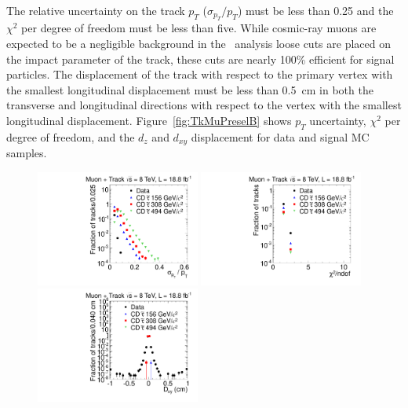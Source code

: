 The relative uncertainty on the track $p_T$ ($\sigma_{p_T}/p_T$) must be less than 0.25 and the $\chi^2$ per degree of freedom must be less than five.
While cosmic-ray muons are expected to be a negligible background in the \tktof\ analysis loose cuts are placed on the impact parameter of the track, 
these cuts are nearly 100\% efficient for signal particles.
The displacement of the track with respect to the primary vertex
with the smallest longitudinal displacement must be less than 0.5~cm in both the transverse and longitudinal directions with respect to the vertex with the smallest
longitudinal displacement.
Figure~\ref{fig:TkMuPreselB} shows $p_T$ uncertainty, $\chi^2$ per degree of freedom, and the $d_z$ and $d_{xy}$ displacement for data and signal MC samples.

\begin{figure}
\centering
  \includegraphics[clip=false, trim=0.0cm 0cm 0.0cm 0cm, width=0.48\textwidth]{figures/tkmu/Selection_Comp_8TeV_GMStau_Pterr_BS}
  \includegraphics[clip=false, trim=0.0cm 0cm 0.0cm 0cm, width=0.48\textwidth]{figures/tkmu/Selection_Comp_8TeV_GMStau_Chi2_BS} \\
  \includegraphics[clip=false, trim=0.0cm 0cm 0.0cm 0cm, width=0.48\textwidth]{figures/tkmu/Selection_Comp_8TeV_GMStau_Dxy_BS}

\end{figure}
